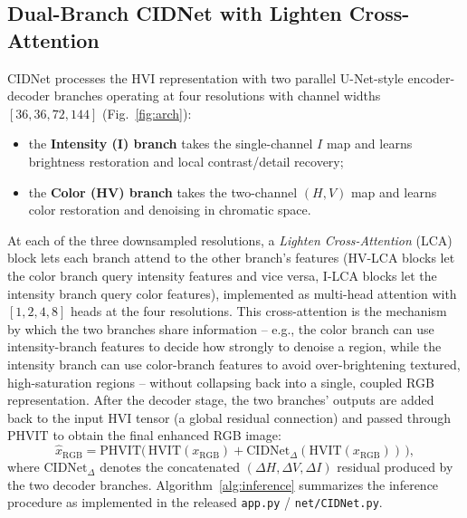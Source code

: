 \documentclass[conference]{IEEEtran}
\begin{document}
\subsection{Dual-Branch CIDNet with Lighten Cross-Attention}
CIDNet processes the HVI representation with two parallel U-Net-style
encoder-decoder branches operating at four resolutions with channel widths
$[36,36,72,144]$ (Fig.~\ref{fig:arch}):
\begin{itemize}
  \item the \textbf{Intensity (I) branch} takes the single-channel $I$ map
  and learns brightness restoration and local contrast/detail recovery;
  \item the \textbf{Color (HV) branch} takes the two-channel $(H,V)$ map and
  learns color restoration and denoising in chromatic space.
\end{itemize}
At each of the three downsampled resolutions, a \emph{Lighten
Cross-Attention} (LCA) block lets each branch attend to the other branch's
features (HV-LCA blocks let the color branch query intensity features and
vice versa, I-LCA blocks let the intensity branch query color features),
implemented as multi-head attention with $[1,2,4,8]$ heads at the four
resolutions. This cross-attention is the mechanism by which the two branches
share information -- e.g., the color branch can use intensity-branch
features to decide how strongly to denoise a region, while the intensity
branch can use color-branch features to avoid over-brightening textured,
high-saturation regions -- without collapsing back into a single, coupled
RGB representation. After the decoder stage, the two branches' outputs are
added back to the input HVI tensor (a global residual connection) and passed
through $\mathrm{PHVIT}$ to obtain the final enhanced RGB image:
\begin{equation}
\hat{x}_{\text{RGB}} = \mathrm{PHVIT}\big(\,\mathrm{HVIT}(x_{\text{RGB}}) +
\mathrm{CIDNet}_{\Delta}(\mathrm{HVIT}(x_{\text{RGB}}))\,\big),
\end{equation}
where $\mathrm{CIDNet}_{\Delta}$ denotes the concatenated $(\Delta H, \Delta
V, \Delta I)$ residual produced by the two decoder branches. Algorithm~\ref{alg:inference}
summarizes the inference procedure as implemented in the released
\texttt{app.py} / \texttt{net/CIDNet.py}.
\end{document}
